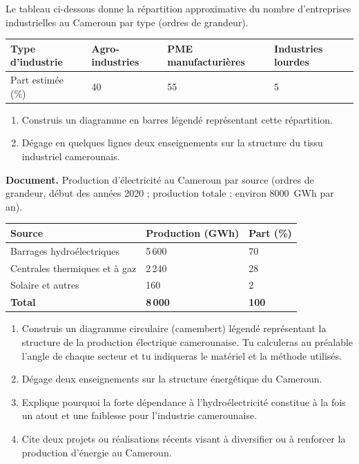 \documentclass[11pt]{article}
\newcounter{popsec}
\newcounter{popsub}
\newcommand{\courssub}[1]{%
  \stepcounter{popsub}%
  \par\vspace{9pt}\noindent{\popxbold\fontsize{11.5}{13}\selectfont\color{popink}{\color{poporange}\thepopsec.\thepopsub}\hspace{6pt}#1}\par\nopagebreak\vspace{4pt}
}
\begin{document}
\begin{exercice}
Le tableau ci-dessous donne la répartition approximative du nombre d'entreprises industrielles au Cameroun par type (ordres de grandeur).

\begin{center}
\begin{tabularx}{\linewidth}{|l|X|X|X|}
\hline
\rowcolor{popblueL} \textbf{Type d'industrie} & \textbf{Agro-industries} & \textbf{PME manufacturières} & \textbf{Industries lourdes} \\
\hline
Part estimée (\%) & 40 & 55 & 5 \\
\hline
\end{tabularx}
\end{center}

\begin{enumerate}
\item Construis un diagramme en barres légendé représentant cette répartition.
\item Dégage en quelques lignes deux enseignements sur la structure du tissu industriel camerounais.
\end{enumerate}
\end{exercice}

\courssub{Je me prépare au Bac}

\begin{exercice}
\textbf{Document.} Production d'électricité au Cameroun par source (ordres de grandeur, début des années 2020 ; production totale : environ \SI{8000}{GWh} par an).

\begin{center}
\begin{tabularx}{\linewidth}{|l|X|X|}
\hline
\rowcolor{popblueL} \textbf{Source} & \textbf{Production (GWh)} & \textbf{Part (\%)} \\
\hline
Barrages hydroélectriques & 5\,600 & 70 \\
\hline
Centrales thermiques et à gaz & 2\,240 & 28 \\
\hline
Solaire et autres & 160 & 2 \\
\hline
\textbf{Total} & \textbf{8\,000} & \textbf{100} \\
\hline
\end{tabularx}
\end{center}

\begin{enumerate}
\item Construis un diagramme circulaire (camembert) légendé représentant la structure de la production électrique camerounaise. Tu calculeras au préalable l'angle de chaque secteur et tu indiqueras le matériel et la méthode utilisés.
\item Dégage deux enseignements sur la structure énergétique du Cameroun.
\item Explique pourquoi la forte dépendance à l'hydroélectricité constitue à la fois un atout et une faiblesse pour l'industrie camerounaise.
\item Cite deux projets ou réalisations récents visant à diversifier ou à renforcer la production d'énergie au Cameroun.
\end{enumerate}
\end{exercice}
\end{document}
